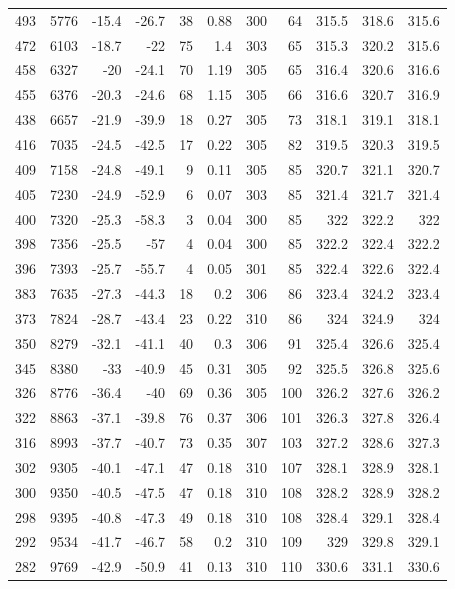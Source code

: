 \documentclass{article}
\begin{document}
\begin{longtable}{r|r|r|r|r|r|r|r|r|r|r}
493 & 5776 & -15.4 & -26.7 & 38 & 0.88 & 300 & 64 & 315.5 & 318.6 & 315.6 \\
472 & 6103 & -18.7 & -22 & 75 & 1.4 & 303 & 65 & 315.3 & 320.2 & 315.6 \\
458 & 6327 & -20 & -24.1 & 70 & 1.19 & 305 & 65 & 316.4 & 320.6 & 316.6 \\
455 & 6376 & -20.3 & -24.6 & 68 & 1.15 & 305 & 66 & 316.6 & 320.7 & 316.9 \\
438 & 6657 & -21.9 & -39.9 & 18 & 0.27 & 305 & 73 & 318.1 & 319.1 & 318.1 \\
416 & 7035 & -24.5 & -42.5 & 17 & 0.22 & 305 & 82 & 319.5 & 320.3 & 319.5 \\
409 & 7158 & -24.8 & -49.1 & 9 & 0.11 & 305 & 85 & 320.7 & 321.1 & 320.7 \\
405 & 7230 & -24.9 & -52.9 & 6 & 0.07 & 303 & 85 & 321.4 & 321.7 & 321.4 \\
400 & 7320 & -25.3 & -58.3 & 3 & 0.04 & 300 & 85 & 322 & 322.2 & 322 \\
398 & 7356 & -25.5 & -57 & 4 & 0.04 & 300 & 85 & 322.2 & 322.4 & 322.2 \\
396 & 7393 & -25.7 & -55.7 & 4 & 0.05 & 301 & 85 & 322.4 & 322.6 & 322.4 \\
383 & 7635 & -27.3 & -44.3 & 18 & 0.2 & 306 & 86 & 323.4 & 324.2 & 323.4 \\
373 & 7824 & -28.7 & -43.4 & 23 & 0.22 & 310 & 86 & 324 & 324.9 & 324 \\
350 & 8279 & -32.1 & -41.1 & 40 & 0.3 & 306 & 91 & 325.4 & 326.6 & 325.4 \\
345 & 8380 & -33 & -40.9 & 45 & 0.31 & 305 & 92 & 325.5 & 326.8 & 325.6 \\
326 & 8776 & -36.4 & -40 & 69 & 0.36 & 305 & 100 & 326.2 & 327.6 & 326.2 \\
322 & 8863 & -37.1 & -39.8 & 76 & 0.37 & 306 & 101 & 326.3 & 327.8 & 326.4 \\
316 & 8993 & -37.7 & -40.7 & 73 & 0.35 & 307 & 103 & 327.2 & 328.6 & 327.3 \\
302 & 9305 & -40.1 & -47.1 & 47 & 0.18 & 310 & 107 & 328.1 & 328.9 & 328.1 \\
300 & 9350 & -40.5 & -47.5 & 47 & 0.18 & 310 & 108 & 328.2 & 328.9 & 328.2 \\
298 & 9395 & -40.8 & -47.3 & 49 & 0.18 & 310 & 108 & 328.4 & 329.1 & 328.4 \\
292 & 9534 & -41.7 & -46.7 & 58 & 0.2 & 310 & 109 & 329 & 329.8 & 329.1 \\
282 & 9769 & -42.9 & -50.9 & 41 & 0.13 & 310 & 110 & 330.6 & 331.1 & 330.6 \\

\end{longtable}
\end{document}

